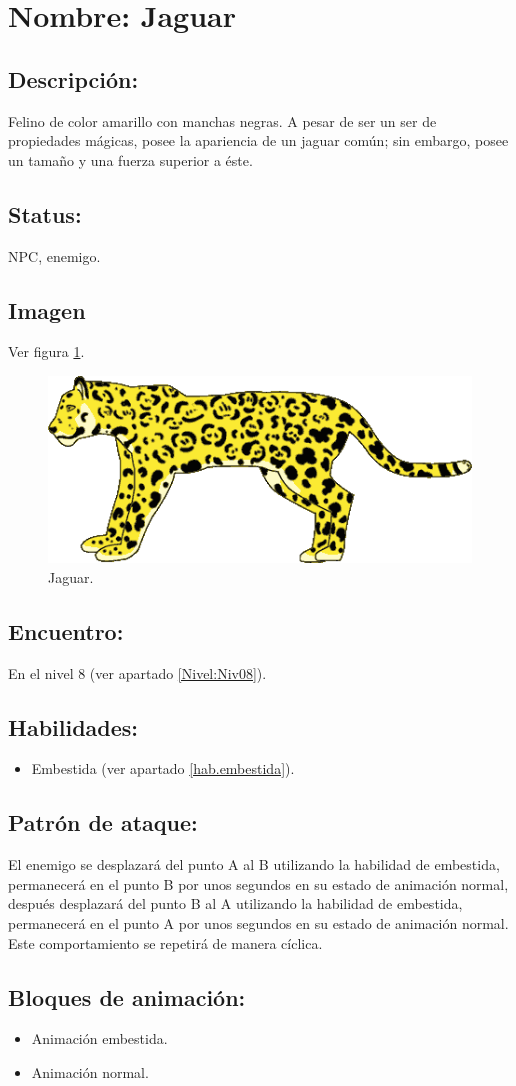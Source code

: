 \section{Nombre: Jaguar}   \label{per:jaguar}
\subsection{Descripción:}
Felino de color amarillo con manchas negras. A pesar de ser un ser de propiedades mágicas, posee la apariencia de un jaguar común; sin embargo, posee un tamaño y una fuerza superior a éste.
\subsection{Status:}
NPC, enemigo.
\subsection{Imagen}
Ver figura \ref{fig:jaguar}.
\begin{figure}
	\centering
	\includegraphics[height=0.2 \textheight]{Imagenes/jaguar}
	\caption{Jaguar.}
	\label{fig:jaguar}
\end{figure}
\subsection{Encuentro:}
En el nivel 8 (ver apartado \ref{Nivel:Niv08}).
\subsection{Habilidades:}
\begin{itemize}
	\item Embestida (ver apartado \ref{hab.embestida}).
\end{itemize}
\subsection{Patrón de ataque:}
El enemigo se desplazará del punto A al B utilizando la habilidad de embestida, permanecerá en el punto B por unos segundos en su estado de animación normal, después desplazará del punto B al A utilizando la habilidad de embestida, permanecerá en el punto A por unos segundos en su estado de animación normal. Este comportamiento se repetirá de manera cíclica.
\subsection{Bloques de animación:}
	\begin{itemize}
		\item Animación embestida.
		\item Animación normal.
	\end{itemize}
